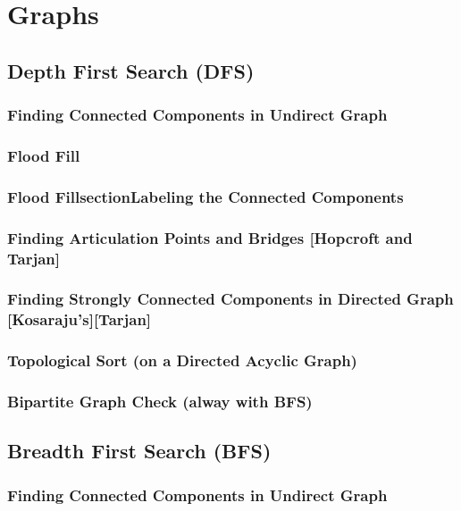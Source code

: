 \chapter{Graphs}
\section {Depth First Search (DFS)}
	
	\subsection {Finding Connected Components in Undirect Graph}
		
	\subsection {Flood Fill}
		
	\subsection {Flood FillsectionLabeling the Connected Components}
	\subsection {Finding Articulation Points and Bridges [Hopcroft and Tarjan]}
		
	\subsection {Finding Strongly Connected Components in Directed Graph [Kosaraju's][Tarjan]}
	\subsection {Topological Sort (on a Directed Acyclic Graph)}
	\subsection {Bipartite Graph Check (alway with BFS)}
\section {Breadth First Search (BFS)}
	
	\subsection {Finding Connected Components in Undirect Graph}
		
